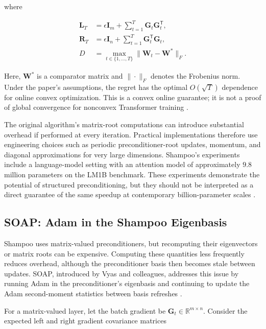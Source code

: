 where

\begin{align}
    \mathbf{L}_T
    &=
    \epsilon\mathbf{I}_m+
    \sum_{t=1}^{T}\mathbf{G}_t\mathbf{G}_t^{\mathsf{T}},
    \label{eq:opt-shampoo-LT}\\
    \mathbf{R}_T
    &=
    \epsilon\mathbf{I}_n+
    \sum_{t=1}^{T}\mathbf{G}_t^{\mathsf{T}}\mathbf{G}_t,
    \label{eq:opt-shampoo-RT}\\
    D
    &=
    \max_{t\in\{1,\ldots,T\}}
    \|\mathbf{W}_t-\mathbf{W}^{*}\|_F.
    \label{eq:opt-shampoo-D}
\end{align}

Here, $\mathbf{W}^{*}$ is a comparator matrix and $\|\cdot\|_F$
denotes the Frobenius norm. Under the paper's assumptions, the regret
has the optimal $O(\sqrt{T})$ dependence for online convex
optimization. This is a convex online guarantee; it is not a proof
of global convergence for nonconvex Transformer training
\parencite{Gupta2018Shampoo}.

The original algorithm's matrix-root computations can introduce
substantial overhead if performed at every iteration. Practical
implementations therefore use engineering choices such as periodic
preconditioner-root updates, momentum, and diagonal approximations for
very large dimensions. Shampoo's experiments include a language-model
setting with an attention model of approximately $9.8$ million
parameters on the LM1B benchmark. These experiments demonstrate the
potential of structured preconditioning, but they should not be
interpreted as a direct guarantee of the same speedup at contemporary
billion-parameter scales \parencite{Gupta2018Shampoo}.

\subsection{SOAP: Adam in the Shampoo Eigenbasis}
\label{subsec:optimization-soap}

Shampoo uses matrix-valued preconditioners, but recomputing their
eigenvectors or matrix roots can be expensive. Computing these
quantities less frequently reduces overhead, although the preconditioner
basis then becomes stale between updates. SOAP, introduced by Vyas
and colleagues, addresses this issue by running Adam in the
preconditioner's eigenbasis and continuing to update the Adam
second-moment statistics between basis refreshes
\parencite{Vyas2025SOAP}.

For a matrix-valued layer, let the batch gradient be
$\mathbf{G}_t\in\mathbb{R}^{m\times n}$. Consider the expected
left and right gradient covariance matrices

